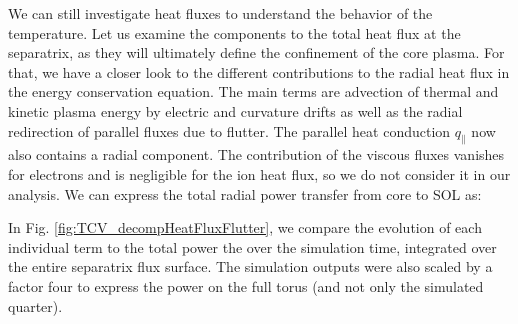We can still investigate heat fluxes to understand the behavior of the temperature. Let us examine the components to the total heat flux at the separatrix, as they will ultimately define the confinement of the core plasma. For that, we have a closer look to the different contributions to the radial heat flux in the energy conservation equation. The main terms are advection of thermal and kinetic plasma energy by electric and curvature drifts as well as the radial redirection of parallel fluxes due to flutter. The parallel heat conduction $q_\parallel$ now also contains a radial component. The contribution of the viscous fluxes vanishes for electrons and is negligible for the ion heat flux, so we do not consider it in our analysis. We can express the total radial power transfer from core to SOL as: 



In Fig. \ref{fig:TCV_decompHeatFluxFlutter}, we compare the evolution of each individual term to the total power the over the simulation time, integrated over the entire separatrix flux surface. The simulation outputs were also scaled by a factor four to express the power on the full torus (and not only the simulated quarter).

